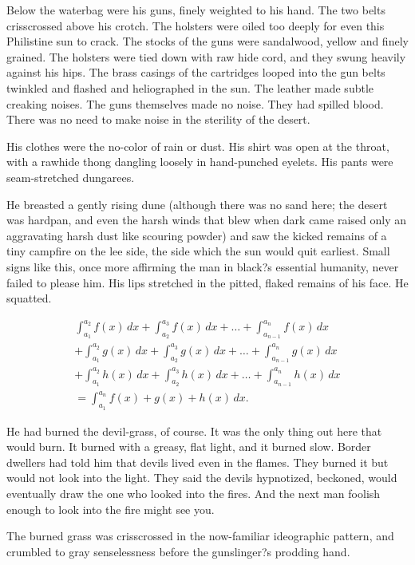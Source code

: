 \documentclass[
11pt,%
tightenlines,%
twoside,%
onecolumn,%
nofloats,%
nobibnotes,%
nofootinbib,%
superscriptaddress,%
noshowpacs,%
centertags]%
{revtex4}
\begin{document}
Below the waterbag were his guns, finely weighted to his hand. The two belts crisscrossed above his crotch. The holsters were oiled too deeply for even this Philistine sun to crack. The stocks of the guns were sandalwood, yellow and finely grained. The holsters were tied down with raw hide cord, and they swung heavily against his hips. The brass casings of the cartridges looped into the gun belts twinkled and flashed and heliographed in the sun. The leather made subtle creaking noises. The guns themselves made no noise. They had spilled blood. There was no need to make noise in the sterility of the desert.

His clothes were the no-color of rain or dust. His shirt was open at the throat, with a rawhide thong dangling loosely in hand-punched eyelets. His pants were seam-stretched dungarees.

He breasted a gently rising dune (although there was no sand here; the desert was hardpan, and even the harsh winds that blew when dark came raised only an aggravating harsh dust like scouring powder) and saw the kicked remains of a tiny campfire on the lee side, the side which the sun would quit earliest. Small signs like this, once more affirming the man in black?s essential humanity, never failed to please him. His lips stretched in the pitted, flaked remains of his face. He squatted.

\begin{multline}
\int_{a_1}^{a_2} f(x)\,dx+\int_{a_2}^{a_3} f(x)\,dx
+\dots+\int_{a_{n-1}}^{a_n} f(x)\,dx\\
+\int_{a_1}^{a_2} g(x)\,dx+\int_{a_2}^{a_3} g(x)\,dx
+\dots+\int_{a_{n-1}}^{a_n} g(x)\,dx\\
+\int_{a_1}^{a_2} h(x)\,dx+\int_{a_2}^{a_3} h(x)\,dx
+\dots+\int_{a_{n-1}}^{a_n} h(x)\,dx\\
=\int_{a_1}^{a_n} f(x)+g(x)+h(x)\,dx.
\end{multline}

He had burned the devil-grass, of course. It was the only thing out here that would burn. It burned with a greasy, flat light, and it burned slow. Border dwellers had told him that devils lived even in the flames. They burned it but would not look into the light. They said the devils hypnotized, beckoned, would eventually draw the one who looked into the fires. And the next man foolish enough to look into the fire might see you.

The burned grass was crisscrossed in the now-familiar ideographic pattern, and crumbled to gray senselessness before the gunslinger?s prodding hand. 
\end{document}
